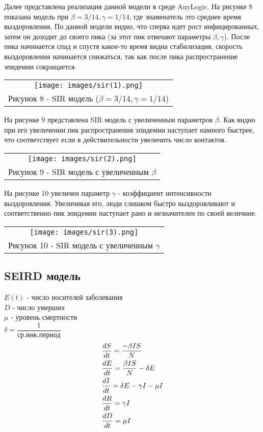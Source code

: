 Далее представлена реализация данной модели в среде AnyLogic. На рисунке 8 показана модель при $\beta=3/14,\gamma=1/14 $, где знаменатель это среднее время выздоровления. По данной модели видно, что сперва идет рост инфицированных, затем он доходит до своего пика (за этот пик отвечают параметры  $\beta,\gamma$). После пика начинается спад и спустя какое-то время видна стабилизация, скорость выздоровления начинается снижаться, так как после пика распространение эпидемии сокращается.
\begin{center}
  \begin{tabular}{c}
    \texttt{[image: images/sir(1).png]}\\
    Рисунок 8 - SIR модель ($\beta=3/14,\gamma=1/14 $)
  \end{tabular}
\end{center}

На рисунке 9 представлена SIR модель с увеличенным параметров $\beta$. Как видно при его увеличении пик распространения эпидемии наступает намного быстрее, что соответствует если в действительности увеличить число контактов.
\begin{center}
  \begin{tabular}{c}
    \texttt{[image: images/sir(2).png]}\\
    Рисунок 9 - SIR модель с увеличенным $\beta$
  \end{tabular}
\end{center}

На рисунке 10 увеличен параметр $\gamma$ - коэффициент интенсивности выздоровления. Увеличивая его, люди слишком быстро выздоровливают и соответственно пик эпидемии наступает рано и незначителен по своей величине.
\begin{center}
  \begin{tabular}{c}
    \texttt{[image: images/sir(3).png]}\\
    Рисунок 10 - SIR модель с увеличенным $\gamma$
  \end{tabular}
\end{center}

\subsection{SEIRD модель}
\noindent $E(t)$ - число носителей заболевания\\
$D$ - число умерших\\
$\mu$ - уровень смертности\\
$\delta=\dfrac{1}{\text{ср.инк.период}}$
\begin{align}
  &\dfrac{d S}{dt}=\dfrac{-\beta IS}{N}\notag\\
  &\dfrac{d E}{dt}=\dfrac{\beta IS}{N}-\delta E\notag\\
  &\dfrac{d I}{dt}=\delta E-\gamma I-\mu I\\
  &\dfrac{d R}{dt}=\gamma I\notag\\
  &\dfrac{d D}{dt}=\mu I\notag
\end{align}

